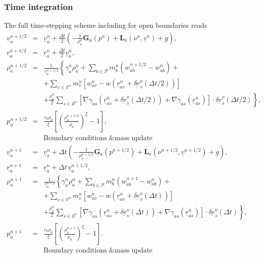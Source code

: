 \documentclass[12pt]{memoir}
\newcommand{\uvec}[1]{\underline{#1}}
\newcommand{\sumP}{\underset{b \in \mathcal{P}}{\sum}}
\newcommand{\Grad}{\textbf{G}}
\newcommand{\Lap}{\textbf{L}}
\begin{document}
\subsubsection{Time integration}
The full time-stepping scheme including for open boundaries reads
\begin{eqnarray}
\uvec{v}_a^{n+1/2} &=& \uvec{v}_a^n + \frac{\Delta t}{2} \left(
-\frac{1}{\rho^n_a}\Grad_a(p^n) + \Lap_a(\nu^n,\uvec{v}^n) + \uvec{g}
\right),
\label{e:sph:pred-corr-ns}
\\
\uvec{r}_a^{n+1/2} &=& \uvec{r}_a^{n} + \frac{\Delta t}{2}
\uvec{v}_a^{n},
\nonumber
\\
\rho_a^{n+1/2} &=& \frac{1}{\gamma_a^{n+1/2}}\left\{ \gamma_a^n \rho_a^n +
\sumP m_b^n (w_{ab}^{n+1/2} - w_{ab}^n) + \right.
\label{e:open:sumrho-time}
\\
&&\left. + \underset{v\in\mathcal{V}^o}{\sum}m_v^n\left[ w_{av}^n -
w\left( \uvec{r}_{av}^n + \uvec{\delta r}_v^o(\Delta t/2) \right) \right]\right.
\nonumber
\\
&&\left. + \frac{\rho_a^n}{2}\underset{s\in\mathcal{S}^o}{\sum}\left[
\nabla\gamma_{as}\left(\uvec{r}_{as}^n + \uvec{\delta r}_s^o(\Delta t/2)\right) +
\nabla\gamma_{as}(\uvec{r}_{as}^n)
\right]\cdot\uvec{\delta r}_s^o(\Delta t/2)\right\},
\nonumber
\\
p_a^{n+1/2} &=& \frac{c_0 \rho_0}{\xi}\left[ \left( \frac{\rho_a^{n+1/2}}{\rho_0}\right)^\xi
-1 \right],
\nonumber
\\
&&\mbox{Boundary conditions \& mass update}
\nonumber
\\
\uvec{v}_a^{n+1} &=& \uvec{v}_a^n + \Delta t \left(
-\frac{1}{\rho^{n+1/2}_a}\Grad_a(p^{n+1/2}) +
\Lap_a(\nu^{n+1/2},\uvec{v}^{n+1/2}) + \uvec{g}
\right),
\nonumber
\\
\uvec{r}_a^{n+1} &=& \uvec{r}_a^{n} + \Delta t\,
\uvec{v}_a^{n+1/2},
\nonumber
\\
\rho_a^{n+1} &=& \frac{1}{\gamma_a^{n+1}}\left\{ \gamma_a^n \rho_a^n +
\sumP m_b^n (w_{ab}^{n+1} - w_{ab}^n) + \right.
\label{e:open:sumrho-time}
\\
&&\left. + \underset{v\in\mathcal{V}^o}{\sum}m_v^n\left[ w_{av}^n -
w\left( \uvec{r}_{av}^n + \uvec{\delta r}_v^o(\Delta t) \right) \right]\right.
\nonumber
\\
&&\left. + \frac{\rho_a^n}{2}\underset{s\in\mathcal{S}^o}{\sum}\left[
\nabla\gamma_{as}\left(\uvec{r}_{as}^n + \uvec{\delta r}_s^o(\Delta t)\right) +
\nabla\gamma_{as}(\uvec{r}_{as}^n)
\right]\cdot\uvec{\delta r}_s^o(\Delta t)\right\},
\nonumber
\\
p_a^{n+1} &=& \frac{c_0 \rho_0}{\xi}\left[ \left( \frac{\rho_a^{n+1}}{\rho_0}\right)^\xi
-1 \right].
\nonumber
\\
&&\mbox{Boundary conditions \& mass update}
\nonumber
\\
\end{eqnarray}
\end{document}
